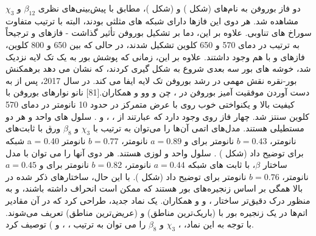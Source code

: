 دو فاز بوروفن به نام‌های  (شکل ) و  (شکل )، مطابق با پیش‌بینی‌های نظری $\beta_{12}$ و $\chi_{3}$ مشاهده شد. هر دوی این فازها دارای شبکه های مثلثی بودند، البته با ترتیب متفاوت سوراخ های تناوبی. علاوه بر این، دما بر تشکیل بوروفن تأثیر گذاشت - فازهای  و  ترجیحاً به ترتیب در دمای 570 و 650 کلوین تشکیل شدند، در حالی که بین 650 و 800 کلوین، فازهای  و  با هم وجود داشتند. علاوه بر این، زمانی که پوشش بور به یک تک لایه نزدیک شد، خوشه های بور سه بعدی شروع به شکل گیری کردند، که نشان می دهد برهمکنش بور-نقره نقش مهمی در رشد بوروفن تک لایه ایفا می کند. در سال 2017، پس از به دست آوردن موفقیت آمیز بوروفن در ، چن و وو و همکاران.[81] نانو نوارهای بوروفن با کیفیت بالا و یکنواختی خوب  روی  با عرض متمرکز در حدود 10 نانومتر در دمای 570 کلوین سنتز شد. چهار فاز روی  وجود دارد که عبارتند از ، ، و . سلول های واحد  و  هر دو مستطیلی هستند. مدل‌های اتمی آن‌ها را می‌توان به ترتیب با $\chi_3$ و $\beta_8$ ورق با ثابت‌های شبکه a = 0.40 نانومتر، $b = 0.43$ نانومتر برای  و $a = 0.89$ نانومتر، $b = 0.77$ نانومتر برای  توضیح داد (شکل ) . سلول واحد  و  لوزی هستند. هر دوی آنها را می توان با مدل ساختار $\beta$، با ثابت های شبکه $a = 0.44$ نانومتر، $b = 0.82$ نانومتر برای  و $a = 0.45$ نانومتر، $b = 0.76$ نانومتر برای  توضیح داد (شکل ). با این حال، ساختارهای ذکر شده در بالا همگی بر اساس زنجیره‌های بور هستند که ممکن است انحراف داشته باشند، و به منظور درک دقیق‌تر ساختار ،  و  و همکاران. یک نماد جدید،  طراحی کرد که در آن مقادیر اتم‌ها در یک زنجیره بور با  (باریک‌ترین مناطق) و  (عریض‌ترین مناطق) تعریف می‌شوند. با توجه به این نماد، ، $\chi_3$  و $\beta_{8}$  را می توان به ترتیب ، ، و ) توصیف کرد.

